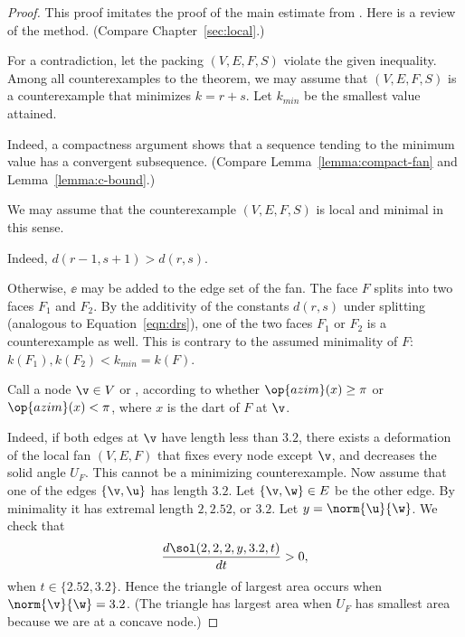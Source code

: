\begin{proof} This proof imitates the proof of the main estimate from
  \cite{Hales:2006:DCG}.  Here is a review of the method.  (Compare
  Chapter~\ref{sec:local}.)

  For a contradiction, let the packing $(V,E,F,S)$ violate the given
  inequality.  Among all counterexamples to the theorem, we may assume
  that $(V,E,F,S)$ is a counterexample that minimizes $k=r+s$.  Let
  $k_{min}$ be the smallest value attained.



    Indeed, a compactness argument shows that a sequence
tending to the minimum value has a convergent subsequence.  (Compare
Lemma~\ref{lemma:compact-fan} and Lemma~\ref{lemma:c-bound}.)

We may assume that the counterexample $(V,E,F,S)$ is local and minimal
in this sense.

  Indeed, $d(r-1,s+1)>d(r,s)$.

  Otherwise, $\ee$ may be added to the edge
set of the fan.  The face $F$ splits into two faces $F_1$ and $F_2$.
By the additivity of the constants $d(r,s)$ under splitting (analogous
to Equation~\ref{eqn:drs}), one of the two faces $F_1$ or $F_2$ is a
counterexample as well.  This is contrary to the assumed minimality of
$F$: $k(F_1),k(F_2)<k_{min}=k(F)$.


Call a node $\v\in V$  or , according
to whether $\op{azim}(x)\ge\pi$ or $\op{azim}(x)<\pi$, where $x$ is
the dart of $F$ at $\v$.  %
%

  Indeed,
if both edges at $\v$ have length less than $3.2$, there exists a
deformation of the local fan $(V,E,F)$ that fixes every node except
$\v$, and decreases the solid angle $U_F$.  This cannot be a
minimizing counterexample.  Now assume that one of the edges
$\{\v,\u\}$ has length $3.2$.  Let $\{\v,\w\}\in E$ be the other edge.
By minimality it has extremal length $2,2.52$, or $3.2$.  Let
$y=\norm{\u}{\w}$.  We check that
\[
\dfrac{d\sol(2,2,2,y,3.2,t)}{dt} >0,
\]
when $t\in\{2.52,3.2\}$.  Hence the triangle of largest area occurs
when $\norm{\v}{\w}=3.2$.  (The triangle has largest area when $U_F$
has smallest area because we are at a concave node.)


\end{proof}
